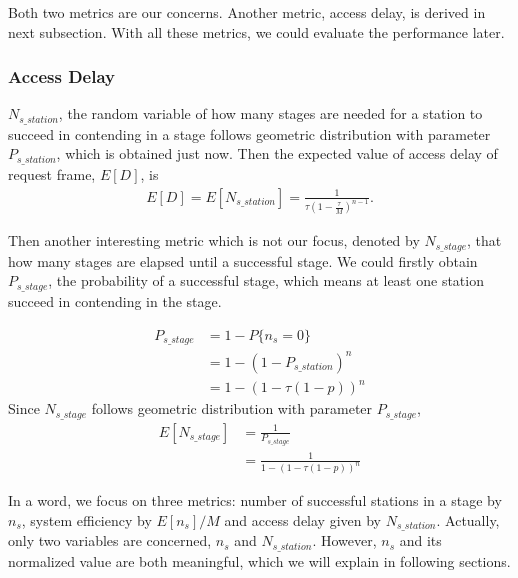 \documentclass[journal]{IEEEtran}
\begin{document}
Both two metrics are our concerns. Another metric, access delay, is derived in next subsection.
With all these metrics, we could evaluate the performance later.

	
\subsubsection{Access Delay}
$N_{s\_station}$, the random variable of how many stages are needed for a station to succeed in contending in a stage follows geometric distribution with parameter $P_{s\_station}$, which is obtained just now.  
Then the expected value of access delay of request frame, $E[D]$, is 
\begin{align}
\label{equ_delay}
E[D] = E[N_{s\_station}] = \frac{1}{\tau (1-\frac{\tau}{M})^{n-1}}.
\end{align}

Then another interesting metric which is not our focus, denoted by $N_{s\_stage}$, that how many stages are elapsed until a successful stage. 
We could firstly obtain $P_{s\_stage}$, the probability of a successful stage, which means at least one station succeed in contending in the stage.

\begin{align}
P_{s\_stage} &= 1-P\lbrace n_s = 0\rbrace \nonumber \\
	&= 1-(1-P_{s\_station})^n \nonumber\\
	&= 1-(1-\tau(1-p))^n
\end{align} 	 
Since $N_{s\_stage}$ follows geometric distribution with parameter $P_{s\_stage}$,  
\begin{align}
E[N_{s\_stage}] &= \frac{1}{P_{s\_stage}}  \nonumber \\
			&= \frac{1}{1-(1-\tau(1-p))^n}
\end{align} 

In a word, we focus on three metrics: number of successful stations in a stage by $n_s$, system efficiency by $E[n_s]/M$ and access delay given by $N_{s\_station}$. 
Actually, only two variables are concerned, $n_s$ and $N_{s\_station}$. However, $n_s$ and its normalized value are both meaningful, which we will explain in following sections.
\end{document}
